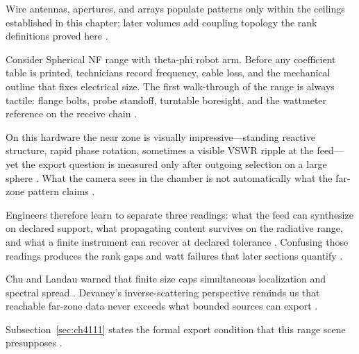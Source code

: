 \label{sec:ch4111}
Wire antennas, apertures, and arrays populate patterns only within the ceilings established in this chapter; later volumes add coupling topology the rank definitions proved here \cite{harrington2001}.

\begin{physicalvignette}
Consider Spherical NF range with theta-phi robot arm. Before any coefficient table is printed, technicians record frequency, cable loss, and the mechanical outline that fixes electrical size. The first walk-through of the range is always tactile: flange bolts, probe standoff, turntable boresight, and the wattmeter reference on the receive chain \cite{hansen1988}.

On this hardware the near zone is visually impressive---standing reactive structure, rapid phase rotation, sometimes a visible VSWR ripple at the feed---yet the export question is measured only after outgoing selection on a large sphere \cite{harrington2001}. What the camera sees in the chamber is not automatically what the far-zone pattern claims \cite{stratton1941}.

Engineers therefore learn to separate three readings: what the feed can synthesize on declared support, what propagating content survives on the radiative range, and what a finite instrument can recover at declared tolerance \cite{devaney2004}. Confusing those readings produces the rank gaps and watt failures that later sections quantify \cite{pal2026}.

Chu and Landau warned that finite size caps simultaneous localization and spectral spread \cite{chu1948}. Devaney's inverse-scattering perspective reminds us that reachable far-zone data never exceeds what bounded sources can export \cite{devaney2004}.

Subsection~\ref{sec:ch4111} states the formal export condition that this range scene presupposes \cite{stratton1941}.
\end{physicalvignette}

